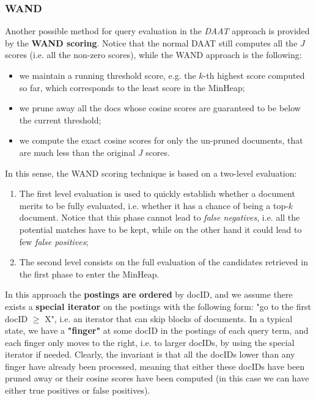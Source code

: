 \subsubsection{WAND}

Another possible method for query evaluation in the \textit{DAAT} approach is provided by the \textbf{WAND scoring}. Notice that the normal DAAT still computes all the $J$ scores (i.e. all the non-zero scores), while the WAND approach is the following:

\begin{itemize}
    \item we maintain a running threshold score, e.g. the $k$-th highest score computed so far, which corresponds to the least score in the MinHeap;
    \item we prune away all the docs whose cosine scores are guaranteed to be below the current threshold;
    \item we compute the exact cosine scores for only the un-pruned documents, that are much less than the original $J$ scores.
\end{itemize}

In this sense, the WAND scoring technique is based on a two-level evaluation:

\begin{enumerate}
    \item The first level evaluation is used to quickly establish whether a document merits to be fully evaluated, i.e. whether it has a chance of being a top-$k$ document. Notice that this phase cannot lead to \textit{false negatives}, i.e. all the potential matches have to be kept, while on the other hand it could lead to few \textit{false positives};
    \item The second level consists on the full evaluation of the candidates retrieved in the first phase to enter the MinHeap.
\end{enumerate}

In this approach the \textbf{postings are ordered} by docID, and we assume there exists a \textbf{special iterator} on the postings with the following form: "go to the first docID $\geq$ X", i.e. an iterator that can skip blocks of documents. In a typical state, we have a \textbf{"finger"} at some docID in the postings of each query term, and each finger only moves to the right, i.e. to larger docIDs, by using the special iterator if needed. Clearly, the invariant is that all the docIDs lower than any finger have already been processed, meaning that either these docIDs have been pruned away or their cosine scores have been computed (in this case we can have either true positives or false positives).

